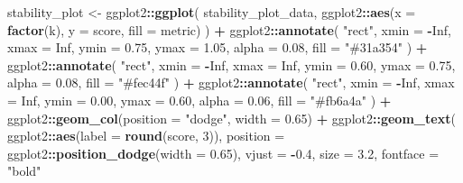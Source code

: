\documentclass[
]{article}
\newenvironment{Shaded}{\begin{snugshade}}{\end{snugshade}}
\newcommand{\AttributeTok}[1]{\textcolor[rgb]{0.13,0.29,0.53}{#1}}
\newcommand{\ConstantTok}[1]{\textcolor[rgb]{0.56,0.35,0.01}{#1}}
\newcommand{\DecValTok}[1]{\textcolor[rgb]{0.00,0.00,0.81}{#1}}
\newcommand{\FloatTok}[1]{\textcolor[rgb]{0.00,0.00,0.81}{#1}}
\newcommand{\FunctionTok}[1]{\textcolor[rgb]{0.13,0.29,0.53}{\textbf{#1}}}
\newcommand{\NormalTok}[1]{#1}
\newcommand{\OtherTok}[1]{\textcolor[rgb]{0.56,0.35,0.01}{#1}}
\newcommand{\SpecialCharTok}[1]{\textcolor[rgb]{0.81,0.36,0.00}{\textbf{#1}}}
\newcommand{\StringTok}[1]{\textcolor[rgb]{0.31,0.60,0.02}{#1}}
\begin{document}
\begin{Shaded}
\begin{Highlighting}[]
\NormalTok{stability\_plot }\OtherTok{\textless{}{-}}\NormalTok{ ggplot2}\SpecialCharTok{::}\FunctionTok{ggplot}\NormalTok{(}
\NormalTok{  stability\_plot\_data,}
\NormalTok{  ggplot2}\SpecialCharTok{::}\FunctionTok{aes}\NormalTok{(}\AttributeTok{x =} \FunctionTok{factor}\NormalTok{(k), }\AttributeTok{y =}\NormalTok{ score, }\AttributeTok{fill =}\NormalTok{ metric)}
\NormalTok{) }\SpecialCharTok{+}
\NormalTok{  ggplot2}\SpecialCharTok{::}\FunctionTok{annotate}\NormalTok{(}
    \StringTok{"rect"}\NormalTok{, }\AttributeTok{xmin =} \SpecialCharTok{{-}}\ConstantTok{Inf}\NormalTok{, }\AttributeTok{xmax =} \ConstantTok{Inf}\NormalTok{,}
    \AttributeTok{ymin =} \FloatTok{0.75}\NormalTok{, }\AttributeTok{ymax =} \FloatTok{1.05}\NormalTok{, }\AttributeTok{alpha =} \FloatTok{0.08}\NormalTok{, }\AttributeTok{fill =} \StringTok{"\#31a354"}
\NormalTok{  ) }\SpecialCharTok{+}
\NormalTok{  ggplot2}\SpecialCharTok{::}\FunctionTok{annotate}\NormalTok{(}
    \StringTok{"rect"}\NormalTok{, }\AttributeTok{xmin =} \SpecialCharTok{{-}}\ConstantTok{Inf}\NormalTok{, }\AttributeTok{xmax =} \ConstantTok{Inf}\NormalTok{,}
    \AttributeTok{ymin =} \FloatTok{0.60}\NormalTok{, }\AttributeTok{ymax =} \FloatTok{0.75}\NormalTok{, }\AttributeTok{alpha =} \FloatTok{0.08}\NormalTok{, }\AttributeTok{fill =} \StringTok{"\#fec44f"}
\NormalTok{  ) }\SpecialCharTok{+}
\NormalTok{  ggplot2}\SpecialCharTok{::}\FunctionTok{annotate}\NormalTok{(}
    \StringTok{"rect"}\NormalTok{, }\AttributeTok{xmin =} \SpecialCharTok{{-}}\ConstantTok{Inf}\NormalTok{, }\AttributeTok{xmax =} \ConstantTok{Inf}\NormalTok{,}
    \AttributeTok{ymin =} \FloatTok{0.00}\NormalTok{, }\AttributeTok{ymax =} \FloatTok{0.60}\NormalTok{, }\AttributeTok{alpha =} \FloatTok{0.06}\NormalTok{, }\AttributeTok{fill =} \StringTok{"\#fb6a4a"}
\NormalTok{  ) }\SpecialCharTok{+}
\NormalTok{  ggplot2}\SpecialCharTok{::}\FunctionTok{geom\_col}\NormalTok{(}\AttributeTok{position =} \StringTok{"dodge"}\NormalTok{, }\AttributeTok{width =} \FloatTok{0.65}\NormalTok{) }\SpecialCharTok{+}
\NormalTok{  ggplot2}\SpecialCharTok{::}\FunctionTok{geom\_text}\NormalTok{(}
\NormalTok{    ggplot2}\SpecialCharTok{::}\FunctionTok{aes}\NormalTok{(}\AttributeTok{label =} \FunctionTok{round}\NormalTok{(score, }\DecValTok{3}\NormalTok{)),}
    \AttributeTok{position =}\NormalTok{ ggplot2}\SpecialCharTok{::}\FunctionTok{position\_dodge}\NormalTok{(}\AttributeTok{width =} \FloatTok{0.65}\NormalTok{),}
    \AttributeTok{vjust =} \SpecialCharTok{{-}}\FloatTok{0.4}\NormalTok{, }\AttributeTok{size =} \FloatTok{3.2}\NormalTok{, }\AttributeTok{fontface =} \StringTok{"bold"}

\end{Highlighting}
\end{Shaded}
\end{document}
